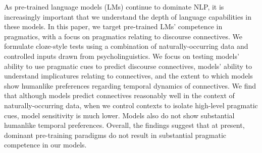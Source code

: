As pre-trained language models (LMs) continue to dominate NLP, it is increasingly important that we understand the depth of language capabilities in these models. In this paper, we target pre-trained LMs' competence in pragmatics, with a focus on pragmatics relating to discourse connectives. We formulate cloze-style tests using a combination of naturally-occurring data and controlled inputs drawn from psycholinguistics. We focus on testing models' ability to use pragmatic cues to predict discourse connectives, models' ability to understand implicatures relating to connectives, and the extent to which models show humanlike preferences regarding temporal dynamics of connectives. We find that although models predict connectives reasonably well in the context of naturally-occurring data, when we control contexts to isolate high-level pragmatic cues, model sensitivity is much lower. Models also do not show substantial humanlike temporal preferences. Overall, the findings suggest that at present, dominant pre-training paradigms do not result in substantial pragmatic competence in our models.
